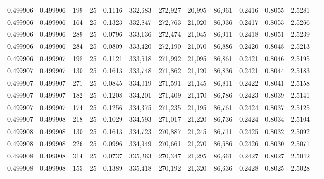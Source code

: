 \begin{tabular}{rrrrrrrrrrrrr}
0.499906 & 0.499906 &   199 &  25 &                                     0.1116 & 332,683 & 272,927 &  20,995 &  86,961 & 0.2416 & 0.8055 & 2.5281 \\
0.499906 & 0.499906 &   164 &  25 &                                     0.1323 & 332,847 & 272,763 &  21,020 &  86,936 & 0.2417 & 0.8053 & 2.5266 \\
0.499906 & 0.499906 &   289 &  25 &                                     0.0796 & 333,136 & 272,474 &  21,045 &  86,911 & 0.2418 & 0.8051 & 2.5239 \\
0.499906 & 0.499906 &   284 &  25 &                                     0.0809 & 333,420 & 272,190 &  21,070 &  86,886 & 0.2420 & 0.8048 & 2.5213 \\
0.499906 & 0.499907 &   198 &  25 &                                     0.1121 & 333,618 & 271,992 &  21,095 &  86,861 & 0.2421 & 0.8046 & 2.5195 \\
0.499907 & 0.499907 &   130 &  25 &                                     0.1613 & 333,748 & 271,862 &  21,120 &  86,836 & 0.2421 & 0.8044 & 2.5183 \\
0.499907 & 0.499907 &   271 &  25 &                                     0.0845 & 334,019 & 271,591 &  21,145 &  86,811 & 0.2422 & 0.8041 & 2.5158 \\
0.499907 & 0.499907 &   182 &  25 &                                     0.1208 & 334,201 & 271,409 &  21,170 &  86,786 & 0.2423 & 0.8039 & 2.5141 \\
0.499907 & 0.499907 &   174 &  25 &                                     0.1256 & 334,375 & 271,235 &  21,195 &  86,761 & 0.2424 & 0.8037 & 2.5125 \\
0.499907 & 0.499908 &   218 &  25 &                                     0.1029 & 334,593 & 271,017 &  21,220 &  86,736 & 0.2424 & 0.8034 & 2.5104 \\
0.499908 & 0.499908 &   130 &  25 &                                     0.1613 & 334,723 & 270,887 &  21,245 &  86,711 & 0.2425 & 0.8032 & 2.5092 \\
0.499908 & 0.499908 &   226 &  25 &                                     0.0996 & 334,949 & 270,661 &  21,270 &  86,686 & 0.2426 & 0.8030 & 2.5071 \\
0.499908 & 0.499908 &   314 &  25 &                                     0.0737 & 335,263 & 270,347 &  21,295 &  86,661 & 0.2427 & 0.8027 & 2.5042 \\
0.499908 & 0.499908 &   155 &  25 &                                     0.1389 & 335,418 & 270,192 &  21,320 &  86,636 & 0.2428 & 0.8025 & 2.5028 \\

\end{tabular}
